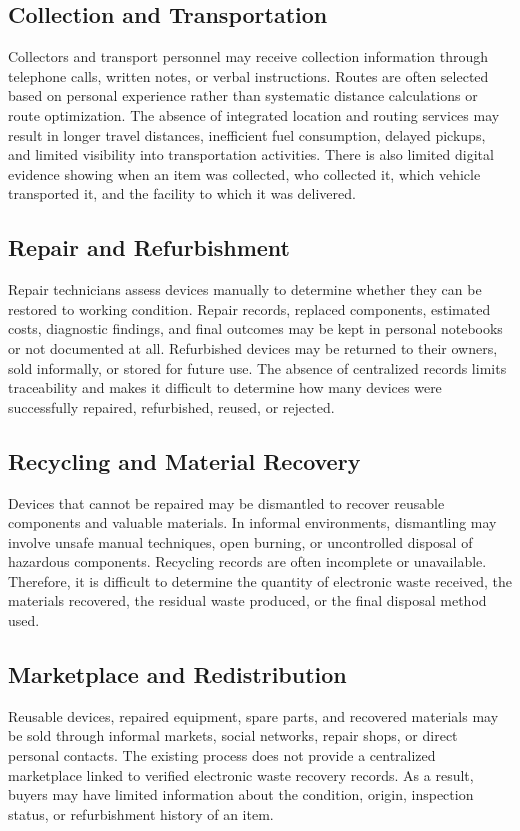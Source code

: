 \subsection{Collection and Transportation}
Collectors and transport personnel may receive collection information through
telephone calls, written notes, or verbal instructions. Routes are often selected
based on personal experience rather than systematic distance calculations or
route optimization. The absence of integrated location and routing services may
result in longer travel distances, inefficient fuel consumption, delayed pickups,
and limited visibility into transportation activities. There is also limited digital
evidence showing when an item was collected, who collected it, which vehicle
transported it, and the facility to which it was delivered.

\subsection{Repair and Refurbishment}
Repair technicians assess devices manually to determine whether they can be
restored to working condition. Repair records, replaced components, estimated
costs, diagnostic findings, and final outcomes may be kept in personal notebooks
or not documented at all. Refurbished devices may be returned to their owners,
sold informally, or stored for future use. The absence of centralized records limits
traceability and makes it difficult to determine how many devices were
successfully repaired, refurbished, reused, or rejected.

\subsection{Recycling and Material Recovery}
Devices that cannot be repaired may be dismantled to recover reusable
components and valuable materials. In informal environments, dismantling may
involve unsafe manual techniques, open burning, or uncontrolled disposal of
hazardous components. Recycling records are often incomplete or unavailable.
Therefore, it is difficult to determine the quantity of electronic waste received,
the materials recovered, the residual waste produced, or the final disposal
method used.

\subsection{Marketplace and Redistribution}
Reusable devices, repaired equipment, spare parts, and recovered materials may
be sold through informal markets, social networks, repair shops, or direct
personal contacts. The existing process does not provide a centralized
marketplace linked to verified electronic waste recovery records. As a result,
buyers may have limited information about the condition, origin, inspection
status, or refurbishment history of an item.

